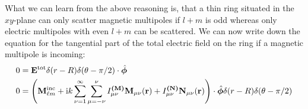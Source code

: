 What we can learn from the above reasoning is, that a thin ring situated in the $xy$-plane can only scatter magnetic multipoles if $l+m$ is odd whereas only electric multipoles with even $l+m$ can be scattered.
We can now write down the equation for the tangential part of the total electric field on the ring if a magnetic multipole is incoming:
\begin{align}
0&=\mathbf{E}^\mathrm{tot}\delta(r-R)\delta(\theta-\pi/2)\cdot \hat{\bm{\phi}} \\
\nonumber
0&=\left(\mathbf{M}^\mathrm{inc}_{\ell m} + \mathrm{i} k \sum_{\nu=1}^\infty  \sum_{\mu=-\nu}^\nu
I_{\mu \nu}^\textbf{(M)}\mathbf{M}_{\mu \nu}(\mathbf{r})+
I_{\mu \nu}^\textbf{(N)}\mathbf{N}_{\mu \nu}(\mathbf{r})\right) \cdot \hat{\bm{\phi}}
\delta(r-R)\delta(\theta-\pi/2)
\end{align}


